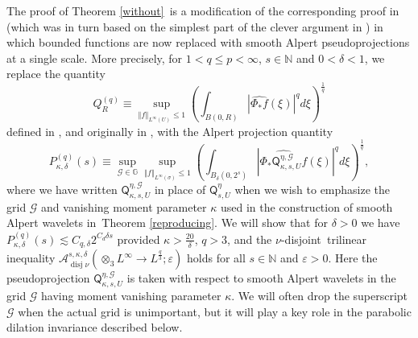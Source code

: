 \documentclass{amsart}%
\theoremstyle{plain}
\numberwithin{equation}{section}
\begin{document}
The proof of Theorem \ref{without}\ is a modification of the corresponding
proof in \cite[proof of Theorem 3]{RiSa} (which was in turn based on the
simplest part of the clever argument in \cite[Section 2]{BoGu}) in which
bounded functions are now replaced with smooth Alpert pseudoprojections at a
single scale. More precisely, for $1<q\leq p<\infty$, $s\in\mathbb{N}$ and
$0<\delta<1$, we replace the quantity
\begin{equation}
Q_{R}^{\left(  q\right)  }\equiv\sup_{\left\Vert f\right\Vert _{L^{\infty
}\left(  U\right)  }\leq1}\left(  \int_{B\left(  0,R\right)  }\left\vert
\widehat{\Phi_{\ast}f}\left(  \xi\right)  \right\vert ^{q}d\xi\right)
^{\frac{1}{q}}\label{def Q}%
\end{equation}
defined in \cite[proof of Theorem 3]{RiSa}, and originally in \cite[Section
2]{BoGu}, with the Alpert projection quantity
\[
P_{\kappa,\delta}^{\left(  q\right)  }\left(  s\right)  \equiv\sup
_{\mathcal{G}\in\mathbb{G}}\sup_{\left\Vert f\right\Vert _{L^{\infty}\left(
\sigma\right)  }\leq1}\left(  \int_{B_{\delta}\left(  0,2^{s}\right)
}\left\vert \widehat{\Phi_{\ast}\mathsf{Q}_{\kappa,s,U}^{\eta,\mathcal{G}}%
f}\left(  \xi\right)  \right\vert ^{q}d\xi\right)  ^{\frac{1}{q}},
\]
where we have written $\mathsf{Q}_{\kappa,s,U}^{\eta,\mathcal{G}}$ in place of
$\mathsf{Q}_{s,U}^{\eta}$ when we wish to emphasize the grid $\mathcal{G}$ and
vanishing moment parameter $\kappa$ used in the construction of smooth Alpert
wavelets in\ Theorem \ref{reproducing}. We will show that for $\delta>0$ we
have $P_{\kappa,\delta}^{\left(  q\right)  }\left(  s\right)  \lesssim
C_{q,\delta}2^{C_{d}\delta s}$ provided $\kappa>\frac{20}{\delta}$, $q>3$, and
the $\nu$-disjoint\emph{\ }trilinear inequality $\mathcal{A}%
_{\operatorname*{disj}\nu}^{s,\kappa,\delta}\left(  \otimes_{3}L^{\infty
}\rightarrow L^{\frac{q}{3}};\varepsilon\right)  $ holds for all
$s\in\mathbb{N}$ and $\varepsilon>0$. Here the pseudoprojection $\mathsf{Q}%
_{\kappa,s,U}^{\eta,\mathcal{G}}$ is taken with respect to smooth Alpert
wavelets in the grid $\mathcal{G}$ having moment vanishing parameter $\kappa$.
We will often drop the superscript $\mathcal{G}$ when the actual grid is
unimportant, but it will play a key role in the parabolic dilation invariance
described below.
\end{document}
